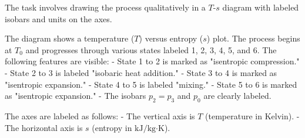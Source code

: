The task involves drawing the process qualitatively in a \( T \)-\( s \) diagram with labeled isobars and units on the axes.  

The diagram shows a temperature (\( T \)) versus entropy (\( s \)) plot. The process begins at \( T_0 \) and progresses through various states labeled 1, 2, 3, 4, 5, and 6. The following features are visible:  
- State 1 to 2 is marked as "isentropic compression."  
- State 2 to 3 is labeled "isobaric heat addition."  
- State 3 to 4 is marked as "isentropic expansion."  
- State 4 to 5 is labeled "mixing."  
- State 5 to 6 is marked as "isentropic expansion."  
- The isobars \( p_2 = p_3 \) and \( p_0 \) are clearly labeled.  

The axes are labeled as follows:  
- The vertical axis is \( T \) (temperature in Kelvin).  
- The horizontal axis is \( s \) (entropy in \( \text{kJ}/\text{kg·K} \)).